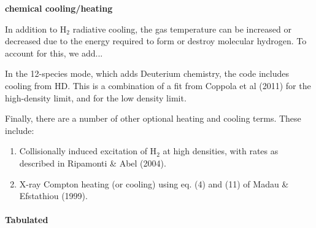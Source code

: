 \label{sec:chemheat}
{\bf chemical cooling/heating}

In addition to H$_2$ radiative cooling, the gas temperature can be increased or decreased due to the energy required to form or destroy molecular hydrogen.  To account for this, we add...

In the 12-species mode, which adds Deuterium chemistry, the code includes cooling from HD.  This is a combination of a fit from Coppola et al (2011) for the high-density limit, and \citet{1998A&A...335..403G} for the low density limit.

Finally, there are a number of other optional heating and cooling terms.  These include:  
\begin{enumerate}
\item Collisionally induced excitation of H$_2$ at high densities, with rates as described in Ripamonti \& Abel (2004). 
\item X-ray Compton heating (or cooling) using eq. (4) and (11) of Madau \& Efstathiou (1999).  
\end{enumerate}


\paragraph{Tabulated} \label{sec:pri-tab}

